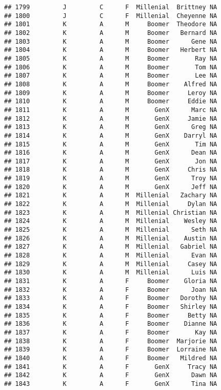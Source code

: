 \documentclass[
]{article}
\begin{document}
\begin{verbatim}
## 1799         J         C      F  Millenial  Brittney NA
## 1800         J         C      F  Millenial  Cheyenne NA
## 1801         K         A      M     Boomer  Theodore NA
## 1802         K         A      M     Boomer   Bernard NA
## 1803         K         A      M     Boomer      Gene NA
## 1804         K         A      M     Boomer   Herbert NA
## 1805         K         A      M     Boomer       Ray NA
## 1806         K         A      M     Boomer       Tom NA
## 1807         K         A      M     Boomer       Lee NA
## 1808         K         A      M     Boomer    Alfred NA
## 1809         K         A      M     Boomer     Leroy NA
## 1810         K         A      M     Boomer     Eddie NA
## 1811         K         A      M       GenX      Marc NA
## 1812         K         A      M       GenX     Jamie NA
## 1813         K         A      M       GenX      Greg NA
## 1814         K         A      M       GenX    Darryl NA
## 1815         K         A      M       GenX       Tim NA
## 1816         K         A      M       GenX      Dean NA
## 1817         K         A      M       GenX       Jon NA
## 1818         K         A      M       GenX     Chris NA
## 1819         K         A      M       GenX      Troy NA
## 1820         K         A      M       GenX      Jeff NA
## 1821         K         A      M  Millenial   Zachary NA
## 1822         K         A      M  Millenial     Dylan NA
## 1823         K         A      M  Millenial Christian NA
## 1824         K         A      M  Millenial    Wesley NA
## 1825         K         A      M  Millenial      Seth NA
## 1826         K         A      M  Millenial    Austin NA
## 1827         K         A      M  Millenial   Gabriel NA
## 1828         K         A      M  Millenial      Evan NA
## 1829         K         A      M  Millenial     Casey NA
## 1830         K         A      M  Millenial      Luis NA
## 1831         K         A      F     Boomer    Gloria NA
## 1832         K         A      F     Boomer      Joan NA
## 1833         K         A      F     Boomer   Dorothy NA
## 1834         K         A      F     Boomer   Shirley NA
## 1835         K         A      F     Boomer     Betty NA
## 1836         K         A      F     Boomer    Dianne NA
## 1837         K         A      F     Boomer       Kay NA
## 1838         K         A      F     Boomer  Marjorie NA
## 1839         K         A      F     Boomer  Lorraine NA
## 1840         K         A      F     Boomer   Mildred NA
## 1841         K         A      F       GenX     Tracy NA
## 1842         K         A      F       GenX      Dawn NA
## 1843         K         A      F       GenX      Tina NA

\end{verbatim}
\end{document}
